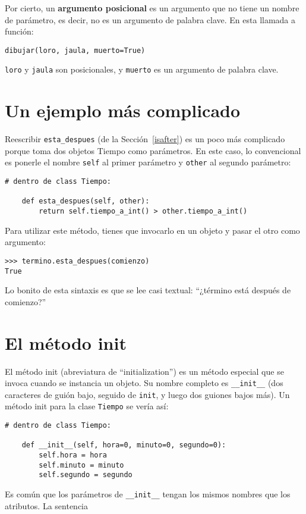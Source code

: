 \documentclass[10pt]{book}
\begin{document}
Por cierto, un {\bf argumento posicional} es un argumento que
no tiene un nombre de parámetro, es decir, no es un argumento de
palabra clave.  En esta llamada a función:

\begin{verbatim}
dibujar(loro, jaula, muerto=True)
\end{verbatim}

{\tt loro} y {\tt jaula} son posicionales, y {\tt muerto} es
un argumento de palabra clave.


\section{Un ejemplo más complicado}

Reescribir \verb"esta_despues" (de la Sección~\ref{isafter}) es un poco
más complicado porque toma dos objetos Tiempo como parámetros.  En
este caso, lo convencional es ponerle el nombre {\tt self} al primer parámetro
y {\tt other} al segundo parámetro: 

\begin{verbatim}
# dentro de class Tiempo:

    def esta_despues(self, other):
        return self.tiempo_a_int() > other.tiempo_a_int()
\end{verbatim}
%
Para utilizar este método, tienes que invocarlo en un objeto y pasar
el otro como argumento:

\begin{verbatim}
>>> termino.esta_despues(comienzo)
True
\end{verbatim}
%
Lo bonito de esta sintaxis es que se lee
casi textual: ``¿término está después de comienzo?''


\section{El método init}

El método init (abreviatura de ``initialization'') es
un método especial que se invoca cuando se instancia un objeto.
Su nombre completo es \verb"__init__" (dos caracteres de guión bajo,
seguido de {\tt init}, y luego dos guiones bajos más).  Un
método init para la clase {\tt Tiempo} se vería así:

\begin{verbatim}
# dentro de class Tiempo:

    def __init__(self, hora=0, minuto=0, segundo=0):
        self.hora = hora
        self.minuto = minuto
        self.segundo = segundo
\end{verbatim}
%
Es común que los parámetros de \verb"__init__"
tengan los mismos nombres que los atributos.  La sentencia
\end{document}
